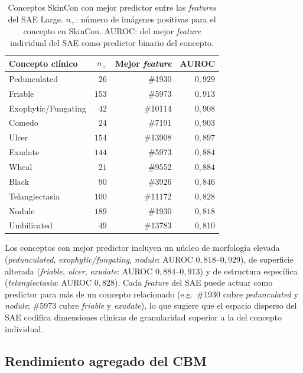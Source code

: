 \begin{table}[H]
\centering
\footnotesize
\setlength{\tabcolsep}{4pt}
\renewcommand{\arraystretch}{0.95}
\caption{Conceptos SkinCon con mejor predictor entre las
\emph{features} del SAE Large. $n_+$: número de imágenes positivas
para el concepto en SkinCon. AUROC: del mejor \emph{feature}
individual del SAE como predictor binario del concepto.}
\label{tab:anexof-cbm}
\begin{tabular}{lrrr}
\hline
Concepto clínico             & $n_+$ & Mejor \emph{feature} & AUROC \\
\hline
Pedunculated                 & $26$  & \#1930 & $0{,}929$ \\
Friable                      & $153$ & \#5973 & $0{,}913$ \\
Exophytic/Fungating          & $42$  & \#10114 & $0{,}908$ \\
Comedo                       & $24$  & \#7191 & $0{,}903$ \\
Ulcer                        & $154$ & \#13908 & $0{,}897$ \\
Exudate                      & $144$ & \#5973 & $0{,}884$ \\
Wheal                        & $21$  & \#9552 & $0{,}884$ \\
Black                        & $90$  & \#3926 & $0{,}846$ \\
Telangiectasia               & $100$ & \#11172 & $0{,}828$ \\
Nodule                       & $189$ & \#1930 & $0{,}818$ \\
Umbilicated                  & $49$  & \#13783 & $0{,}810$ \\
\hline
\end{tabular}
\end{table}

Los conceptos con mejor predictor incluyen un núcleo de morfología
elevada (\emph{pedunculated}, \emph{exophytic/fungating},
\emph{nodule}: AUROC $0{,}818$--$0{,}929$), de
superficie alterada (\emph{friable}, \emph{ulcer}, \emph{exudate}:
AUROC $0{,}884$--$0{,}913$) y de estructura específica
(\emph{telangiectasia}: AUROC $0{,}828$). Cada \emph{feature}
del SAE puede actuar como predictor para más de un concepto
relacionado (e.g.~\#1930 cubre \emph{pedunculated} y
\emph{nodule}; \#5973 cubre \emph{friable} y \emph{exudate}), lo
que sugiere que el espacio disperso del SAE codifica dimensiones
clínicas de granularidad superior a la del concepto individual.

\subsection{Rendimiento agregado del CBM}
\label{sec:anexof-cbm-agregado}

